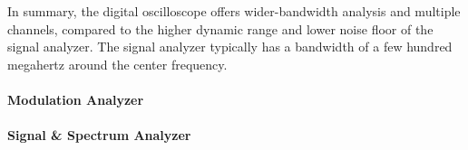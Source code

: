 



	In summary, the digital oscilloscope offers wider-bandwidth analysis and multiple channels, compared to the higher dynamic range and lower noise floor of the signal analyzer. The signal analyzer typically has a bandwidth of a few hundred megahertz around the center frequency.


\paragraph*{Modulation Analyzer}

\paragraph*{Signal \& Spectrum Analyzer}

